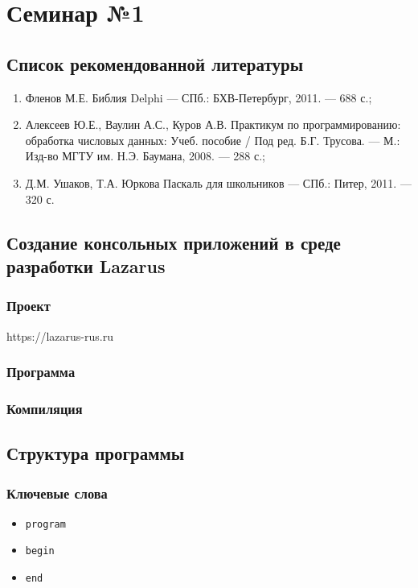 \section{Семинар №1}

\subsection{Список рекомендованной литературы}
\begin{enumerate}
\item Фленов М.Е. Библия Delphi --- СПб.: БХВ-Петербург, 2011. --- 688 с.;
\item Алексеев Ю.Е., Ваулин А.С., Куров А.В. Практикум по программированию: обработка числовых данных: Учеб. пособие / Под ред. Б.Г. Трусова. --- М.: Изд-во МГТУ им. Н.Э. Баумана, 2008. --- 288 с.;
\item Д.М. Ушаков, Т.А. Юркова Паскаль для школьников --- СПб.: Питер, 2011. --- 320 с.
\end{enumerate}

\subsection{Создание консольных приложений в среде разработки Lazarus}
\subsubsection{Проект}
https://lazarus-rus.ru
\subsubsection{Программа}
\subsubsection{Компиляция}

\subsection{Структура программы}

\subsubsection{Ключевые слова}
\begin{itemize}
\item \texttt{program}
\item \texttt{begin}
\item \texttt{end}
\end{itemize}

